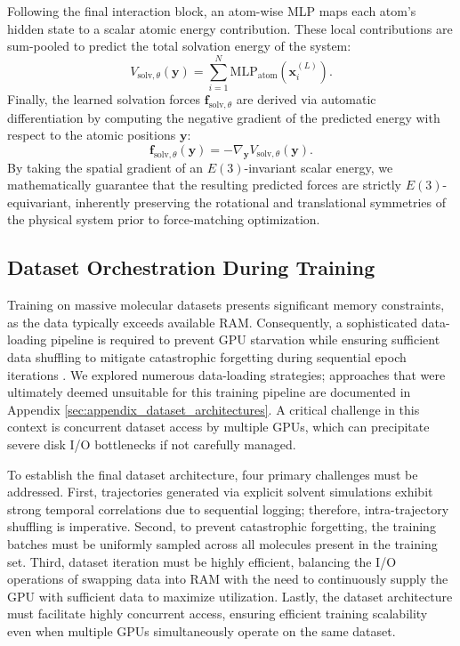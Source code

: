 Following the final interaction block, an atom-wise MLP maps each atom's hidden state to a scalar atomic energy contribution. These local contributions are sum-pooled to predict the total solvation energy of the system:
\begin{equation}
    V_{\mathrm{solv},\theta}(\mathbf{y}) = \sum_{i=1}^{N} \mathrm{MLP}_{\mathrm{atom}}\left(\mathbf{x}_i^{(L)}\right).
\end{equation}
Finally, the learned solvation forces $\mathbf{f}_{\mathrm{solv},\theta}$ are derived via automatic differentiation by computing the negative gradient of the predicted energy with respect to the atomic positions $\mathbf{y}$:
\begin{equation}
    \mathbf{f}_{\mathrm{solv},\theta}(\mathbf{y}) = -\nabla_{\mathbf{y}} V_{\mathrm{solv},\theta}(\mathbf{y}).
\end{equation}
By taking the spatial gradient of an $E(3)$-invariant scalar energy, we mathematically guarantee that the resulting predicted forces are strictly $E(3)$-equivariant, inherently preserving the rotational and translational symmetries of the physical system prior to force-matching optimization.





\subsection{Dataset Orchestration During Training}
Training on massive molecular datasets presents significant memory constraints, as the data typically exceeds available RAM. Consequently, a sophisticated data-loading pipeline is required to prevent GPU starvation while ensuring sufficient data shuffling to mitigate catastrophic forgetting during sequential epoch iterations \citep{MCCLOSKEY1989109, eckhoff2023lifelong}. We explored numerous data-loading strategies; approaches that were ultimately deemed unsuitable for this training pipeline are documented in Appendix \ref{sec:appendix_dataset_architectures}. A critical challenge in this context is concurrent dataset access by multiple GPUs, which can precipitate severe disk I/O bottlenecks if not carefully managed.

To establish the final dataset architecture, four primary challenges must be addressed. First, trajectories generated via explicit solvent simulations exhibit strong temporal correlations due to sequential logging; therefore, intra-trajectory shuffling is imperative. Second, to prevent catastrophic forgetting, the training batches must be uniformly sampled across all molecules present in the training set. Third, dataset iteration must be highly efficient, balancing the I/O operations of swapping data into RAM with the need to continuously supply the GPU with sufficient data to maximize utilization. Lastly, the dataset architecture must facilitate highly concurrent access, ensuring efficient training scalability even when multiple GPUs simultaneously operate on the same dataset.

